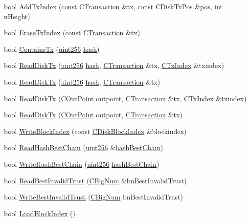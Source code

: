 \begin{DoxyCompactItemize}
\item 
bool \hyperlink{class_c_tx_d_b_a6c0d7c688e8fd7ac28afde78ae6b624e}{Add\+Tx\+Index} (const \hyperlink{class_c_transaction}{C\+Transaction} \&tx, const \hyperlink{class_c_disk_tx_pos}{C\+Disk\+Tx\+Pos} \&pos, int n\+Height)
\item 
bool \hyperlink{class_c_tx_d_b_a5e0f0ed39529758a90953a2a08fc9412}{Erase\+Tx\+Index} (const \hyperlink{class_c_transaction}{C\+Transaction} \&tx)
\item 
bool \hyperlink{class_c_tx_d_b_a09b87317101ed16b6ad99794279f4c2d}{Contains\+Tx} (\hyperlink{classuint256}{uint256} \hyperlink{cache_8cc_a11ecb029164e055f28f4123ce3748862}{hash})
\item 
bool \hyperlink{class_c_tx_d_b_a32d0e546eee99724776352dd4bf0ae79}{Read\+Disk\+Tx} (\hyperlink{classuint256}{uint256} \hyperlink{cache_8cc_a11ecb029164e055f28f4123ce3748862}{hash}, \hyperlink{class_c_transaction}{C\+Transaction} \&tx, \hyperlink{class_c_tx_index}{C\+Tx\+Index} \&txindex)
\item 
bool \hyperlink{class_c_tx_d_b_ab32f32729feabef7162d5fa225dd0e22}{Read\+Disk\+Tx} (\hyperlink{classuint256}{uint256} \hyperlink{cache_8cc_a11ecb029164e055f28f4123ce3748862}{hash}, \hyperlink{class_c_transaction}{C\+Transaction} \&tx)
\item 
bool \hyperlink{class_c_tx_d_b_a80ee65f82bb1a769b507dc5c701bfacc}{Read\+Disk\+Tx} (\hyperlink{class_c_out_point}{C\+Out\+Point} outpoint, \hyperlink{class_c_transaction}{C\+Transaction} \&tx, \hyperlink{class_c_tx_index}{C\+Tx\+Index} \&txindex)
\item 
bool \hyperlink{class_c_tx_d_b_a4d7f67f600359473ddd2044030323215}{Read\+Disk\+Tx} (\hyperlink{class_c_out_point}{C\+Out\+Point} outpoint, \hyperlink{class_c_transaction}{C\+Transaction} \&tx)
\item 
bool \hyperlink{class_c_tx_d_b_a56f170187a609bd747c29b3a4adddd8e}{Write\+Block\+Index} (const \hyperlink{class_c_disk_block_index}{C\+Disk\+Block\+Index} \&blockindex)
\item 
bool \hyperlink{class_c_tx_d_b_a9aae38d6e39ce57a1b8eaaeaea81e4de}{Read\+Hash\+Best\+Chain} (\hyperlink{classuint256}{uint256} \&\hyperlink{main_8h_ace9c3343567f488a96598abe61e1d309}{hash\+Best\+Chain})
\item 
bool \hyperlink{class_c_tx_d_b_a2cf58de69c1c07e500a1f8d0b0709476}{Write\+Hash\+Best\+Chain} (\hyperlink{classuint256}{uint256} \hyperlink{main_8h_ace9c3343567f488a96598abe61e1d309}{hash\+Best\+Chain})
\item 
bool \hyperlink{class_c_tx_d_b_ab0e2e8f95c4f891c0a9245d5ba6b0b68}{Read\+Best\+Invalid\+Trust} (\hyperlink{class_c_big_num}{C\+Big\+Num} \&bn\+Best\+Invalid\+Trust)
\item 
bool \hyperlink{class_c_tx_d_b_ad9593efae66f6a73fafba93ad05fd2b8}{Write\+Best\+Invalid\+Trust} (\hyperlink{class_c_big_num}{C\+Big\+Num} bn\+Best\+Invalid\+Trust)
\item 
bool \hyperlink{class_c_tx_d_b_abcb9df0821d996f811f6604b452a26a0}{Load\+Block\+Index} ()
\end{DoxyCompactItemize}
